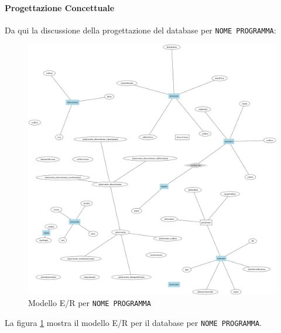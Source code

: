 \paragraph{Progettazione Concettuale}
Da qui la discussione della progettazione del database
per \texttt{NOME PROGRAMMA}:
\begin{figure}
  \includegraphics[width=\linewidth]{images/er.png}
  \caption{Modello E/R per \texttt{NOME PROGRAMMA}}
  \label{fig:er}
\end{figure}

La figura \ref{fig:er} mostra il modello E/R per il
database per \texttt{NOME PROGRAMMA}.
